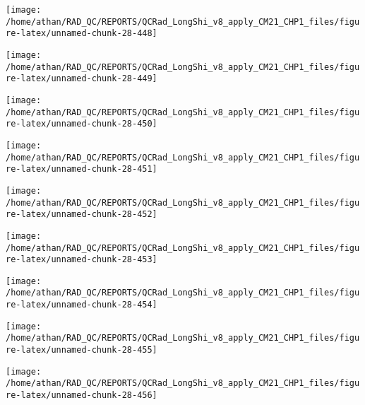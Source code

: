 \documentclass[
  10pt,
  a4paper,oneside]{article}
\begin{document}
\begin{center}\texttt{[image: /home/athan/RAD\_QC/REPORTS/QCRad\_LongShi\_v8\_apply\_CM21\_CHP1\_files/figure-latex/unnamed-chunk-28-448]} \end{center}

\begin{center}\texttt{[image: /home/athan/RAD\_QC/REPORTS/QCRad\_LongShi\_v8\_apply\_CM21\_CHP1\_files/figure-latex/unnamed-chunk-28-449]} \end{center}

\begin{center}\texttt{[image: /home/athan/RAD\_QC/REPORTS/QCRad\_LongShi\_v8\_apply\_CM21\_CHP1\_files/figure-latex/unnamed-chunk-28-450]} \end{center}

\begin{center}\texttt{[image: /home/athan/RAD\_QC/REPORTS/QCRad\_LongShi\_v8\_apply\_CM21\_CHP1\_files/figure-latex/unnamed-chunk-28-451]} \end{center}

\begin{center}\texttt{[image: /home/athan/RAD\_QC/REPORTS/QCRad\_LongShi\_v8\_apply\_CM21\_CHP1\_files/figure-latex/unnamed-chunk-28-452]} \end{center}

\begin{center}\texttt{[image: /home/athan/RAD\_QC/REPORTS/QCRad\_LongShi\_v8\_apply\_CM21\_CHP1\_files/figure-latex/unnamed-chunk-28-453]} \end{center}

\begin{center}\texttt{[image: /home/athan/RAD\_QC/REPORTS/QCRad\_LongShi\_v8\_apply\_CM21\_CHP1\_files/figure-latex/unnamed-chunk-28-454]} \end{center}

\begin{center}\texttt{[image: /home/athan/RAD\_QC/REPORTS/QCRad\_LongShi\_v8\_apply\_CM21\_CHP1\_files/figure-latex/unnamed-chunk-28-455]} \end{center}

\begin{center}\texttt{[image: /home/athan/RAD\_QC/REPORTS/QCRad\_LongShi\_v8\_apply\_CM21\_CHP1\_files/figure-latex/unnamed-chunk-28-456]} \end{center}
\end{document}
